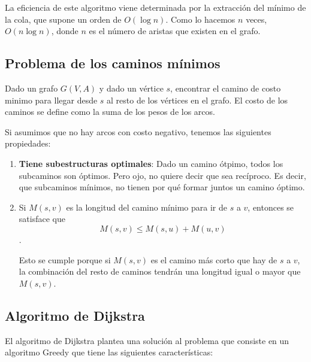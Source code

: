 \documentclass[10pt,a4paper,spanish]{report}
\theoremstyle{definition}
\theoremstyle{remark}
\begin{document}
La eficiencia de este algoritmo viene determinada por la extracción del mínimo de la cola, que supone un orden de $O(\log n)$. Como lo hacemos $n$ veces, $O(n\log n)$, donde $n$ es el número de aristas que existen en el grafo.

\subsection{\textcolor{electriccrimson}Problema de los caminos mínimos}

Dado un grafo $G(V,A)$ y dado un vértice $s$, encontrar el camino de costo minimo para llegar desde $s$ al resto de los vértices en el grafo. El costo de los caminos se define como la suma de los pesos de los arcos.

Si asumimos que no hay arcos con costo negativo, tenemos las siguientes propiedades:

\begin{enumerate}
    \item \textbf{\textcolor{electriccrimson}{Tiene subestructuras optimales}}: Dado un camino ótpimo, todos los subcaminos son óptimos. Pero ojo, no quiere decir que sea recíproco. Es decir, que subcaminos mínimos, no tienen por qué formar juntos un camino óptimo.

    \item Si $M(s,v)$ es la longitud del camino mínimo para ir de $s$ a $v$, entonces se satisface que $$M(s,v) \leq M(s,u) + M(u,v)$$.

    Esto se cumple porque si $M(s,v)$ es el camino más corto que hay de $s$ a $v$, la combinación del resto de caminos tendrán una longitud igual o mayor que $M(s,v)$.
\end{enumerate}

\subsection{\textcolor{electriccrimson}Algoritmo de Dijkstra}

El algoritmo de Dijkstra plantea una solución al problema que consiste en un algoritmo Greedy que tiene las siguientes características:
\end{document}
